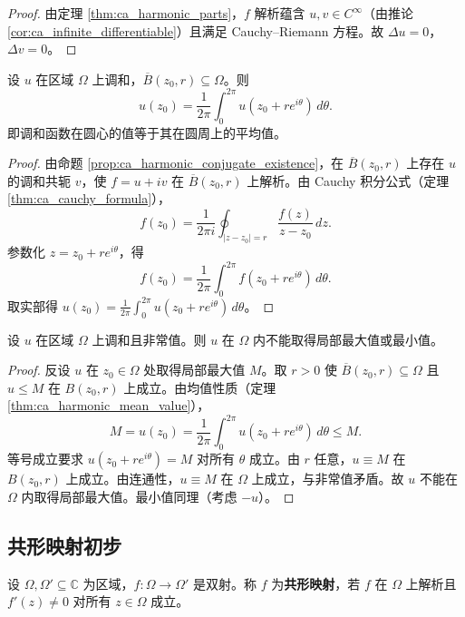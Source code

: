 \begin{proof}
由定理 \ref{thm:ca_harmonic_parts}，$f$ 解析蕴含 $u, v \in C^\infty$（由推论 \ref{cor:ca_infinite_differentiable}）且满足 Cauchy--Riemann 方程。故 $\Delta u = 0$，$\Delta v = 0$。
\end{proof}

\begin{theorem}[调和函数的均值性质]\label{thm:ca_harmonic_mean_value}
设 $u$ 在区域 $\Omega$ 上调和，$\overline{B}(z_0, r) \subseteq \Omega$。则
\[
u(z_0) = \frac{1}{2\pi} \int_0^{2\pi} u(z_0 + re^{i\theta}) \, d\theta.
\]
即调和函数在圆心的值等于其在圆周上的平均值。
\end{theorem}

\begin{proof}
由命题 \ref{prop:ca_harmonic_conjugate_existence}，在 $\overline{B}(z_0, r)$ 上存在 $u$ 的调和共轭 $v$，使 $f = u + iv$ 在 $\overline{B}(z_0, r)$ 上解析。由 Cauchy 积分公式（定理 \ref{thm:ca_cauchy_formula}），
\[
f(z_0) = \frac{1}{2\pi i} \oint_{|z - z_0| = r} \frac{f(z)}{z - z_0} \, dz.
\]
参数化 $z = z_0 + re^{i\theta}$，得
\[
f(z_0) = \frac{1}{2\pi} \int_0^{2\pi} f(z_0 + re^{i\theta}) \, d\theta.
\]
取实部得 $u(z_0) = \frac{1}{2\pi} \int_0^{2\pi} u(z_0 + re^{i\theta}) \, d\theta$。
\end{proof}

\begin{corollary}[调和函数的最大值原理]\label{cor:ca_harmonic_max_principle}
设 $u$ 在区域 $\Omega$ 上调和且非常值。则 $u$ 在 $\Omega$ 内不能取得局部最大值或最小值。
\end{corollary}

\begin{proof}
反设 $u$ 在 $z_0 \in \Omega$ 处取得局部最大值 $M$。取 $r > 0$ 使 $\overline{B}(z_0, r) \subseteq \Omega$ 且 $u \le M$ 在 $B(z_0, r)$ 上成立。由均值性质（定理 \ref{thm:ca_harmonic_mean_value}），
\[
M = u(z_0) = \frac{1}{2\pi} \int_0^{2\pi} u(z_0 + re^{i\theta}) \, d\theta \le M.
\]
等号成立要求 $u(z_0 + re^{i\theta}) = M$ 对所有 $\theta$ 成立。由 $r$ 任意，$u \equiv M$ 在 $B(z_0, r)$ 上成立。由连通性，$u \equiv M$ 在 $\Omega$ 上成立，与非常值矛盾。故 $u$ 不能在 $\Omega$ 内取得局部最大值。最小值同理（考虑 $-u$）。
\end{proof}

\subsection{共形映射初步}

\begin{definition}[共形映射]\label{def:ca_conformal_map}
设 $\Omega, \Omega' \subseteq \mathbb{C}$ 为区域，$f: \Omega \to \Omega'$ 是双射。称 $f$ 为\textbf{共形映射}，若 $f$ 在 $\Omega$ 上解析且 $f'(z) \neq 0$ 对所有 $z \in \Omega$ 成立。
\end{definition}

